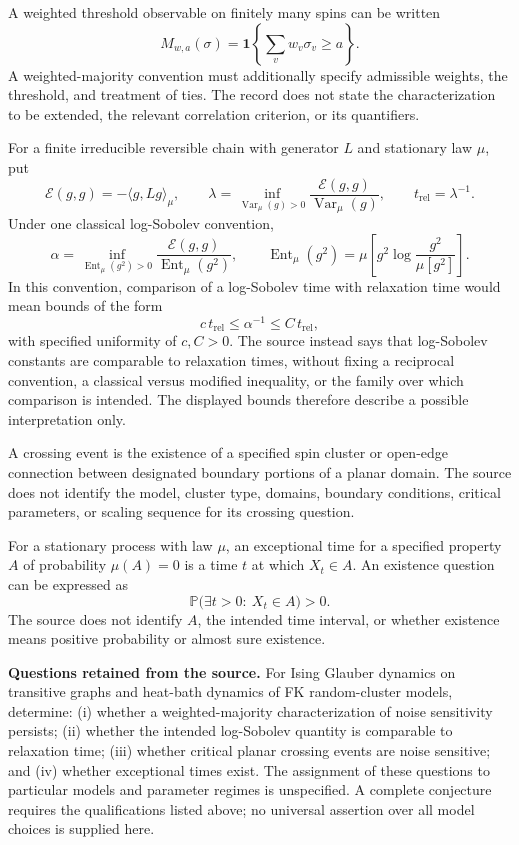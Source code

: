 \documentclass[11pt]{article}
\begin{document}
A weighted threshold observable on finitely many spins can be written
\[
 M_{w,a}(\sigma)=\mathbf{1}\!\left\{\sum_{v}w_v\sigma_v\geq a\right\}.
\]
A weighted-majority convention must additionally specify admissible weights, the threshold, and treatment of ties. The record does not state the characterization to be extended, the relevant correlation criterion, or its quantifiers.

For a finite irreducible reversible chain with generator \(L\) and stationary law \(\mu\), put
\[
 \mathcal E(g,g)=-\langle g,Lg\rangle_{\mu},\qquad
 \lambda=\inf_{\operatorname{Var}_{\mu}(g)>0}
 \frac{\mathcal E(g,g)}{\operatorname{Var}_{\mu}(g)},\qquad
 t_{\mathrm{rel}}=\lambda^{-1}.
\]
Under one classical log-Sobolev convention,
\[
 \alpha=\inf_{\operatorname{Ent}_{\mu}(g^2)>0}
 \frac{\mathcal E(g,g)}{\operatorname{Ent}_{\mu}(g^2)},\qquad
 \operatorname{Ent}_{\mu}(g^2)
 =\mu\!\left[g^2\log\frac{g^2}{\mu[g^2]}\right].
\]
In this convention, comparison of a log-Sobolev time with relaxation time would mean bounds of the form
\[
 c\,t_{\mathrm{rel}}\leq\alpha^{-1}\leq C\,t_{\mathrm{rel}},
\]
with specified uniformity of \(c,C>0\). The source instead says that log-Sobolev constants are comparable to relaxation times, without fixing a reciprocal convention, a classical versus modified inequality, or the family over which comparison is intended. The displayed bounds therefore describe a possible interpretation only.

A crossing event is the existence of a specified spin cluster or open-edge connection between designated boundary portions of a planar domain. The source does not identify the model, cluster type, domains, boundary conditions, critical parameters, or scaling sequence for its crossing question.

For a stationary process with law \(\mu\), an exceptional time for a specified property \(A\) of probability \(\mu(A)=0\) is a time \(t\) at which \(X_t\in A\). An existence question can be expressed as
\[
 \mathbb P\bigl(\exists t>0:\ X_t\in A\bigr)>0.
\]
The source does not identify \(A\), the intended time interval, or whether existence means positive probability or almost sure existence.

\textbf{Questions retained from the source.} For Ising Glauber dynamics on transitive graphs and heat-bath dynamics of FK random-cluster models, determine: (i) whether a weighted-majority characterization of noise sensitivity persists; (ii) whether the intended log-Sobolev quantity is comparable to relaxation time; (iii) whether critical planar crossing events are noise sensitive; and (iv) whether exceptional times exist. The assignment of these questions to particular models and parameter regimes is unspecified. A complete conjecture requires the qualifications listed above; no universal assertion over all model choices is supplied here.
\end{document}
